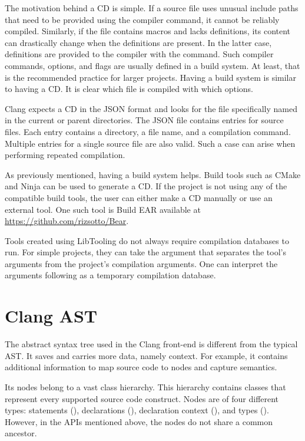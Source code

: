 The motivation behind a CD is simple.
If a source file uses unusual include paths that need to be provided 
using the  compiler command, it cannot be reliably compiled.
Similarly, if the file contains macros and lacks definitions, its content 
can drastically change when the definitions are present.
In the latter case, definitions are provided to the compiler 
with the  command.
Such compiler commands, options, and flags are usually defined in a build 
system.
At least, that is the recommended practice for larger projects.
Having a build system is similar to having a CD.
It is clear which file is compiled with which options.

Clang expects a CD in the JSON format and looks for the file specifically
named   in the current or parent 
directories.
The JSON file contains entries for source files.
Each entry contains a directory, a file name, and a compilation command.
Multiple entries for a single source file are also valid.
Such a case can arise when performing repeated compilation.

As previously mentioned, having a build system helps.
Build tools such as CMake and Ninja can be used to generate a CD.
If the project is not using any of the compatible build tools, 
the user can either make a CD manually or use an external tool.
One such tool is Build EAR available at \url{https://github.com/rizsotto/Bear}.

Tools created using LibTooling do not always require compilation databases 
to run.
For simple projects, they can take the \icode{-{}-} argument that separates 
the tool's arguments from the project's compilation arguments.
One can interpret the arguments following \icode{-{}-} as a temporary
compilation database.

\section{Clang AST}

The abstract syntax tree used in the Clang front-end \citep{ast:online}
is different from the typical AST. 
It saves and carries more data, namely context.  
For example, it contains additional information to map source 
code to nodes and capture semantics. 

Its nodes belong to a vast class hierarchy. 
This hierarchy contains classes that represent every supported 
source code construct.
Nodes are of four different types: statements (), 
declarations (), declaration context (),
and types (). 
However, in the APIs mentioned above, the nodes do not share
a common ancestor.

